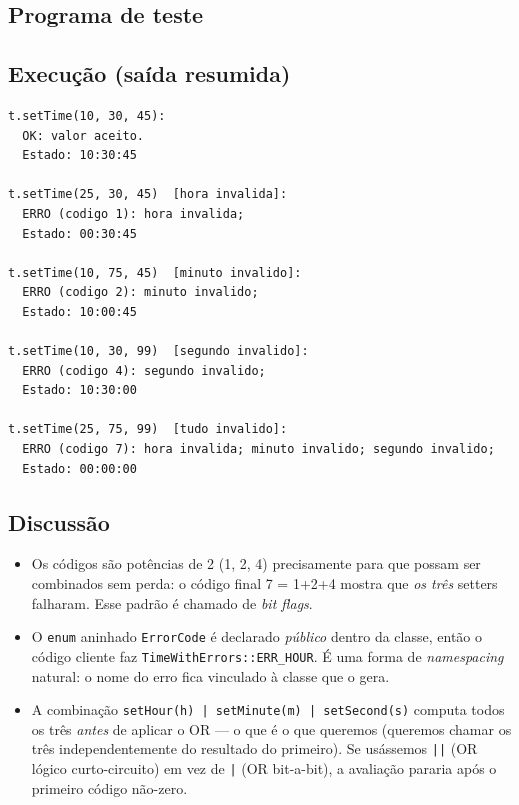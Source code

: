 \documentclass[11pt,a4paper]{article}
\begin{document}
\subsection*{Programa de teste}



\subsection*{Execu\c{c}\~ao (sa\'ida resumida)}

\begin{saidabox}
\begin{lstlisting}[style=terminal]
t.setTime(10, 30, 45):
  OK: valor aceito.
  Estado: 10:30:45

t.setTime(25, 30, 45)  [hora invalida]:
  ERRO (codigo 1): hora invalida;
  Estado: 00:30:45

t.setTime(10, 75, 45)  [minuto invalido]:
  ERRO (codigo 2): minuto invalido;
  Estado: 10:00:45

t.setTime(10, 30, 99)  [segundo invalido]:
  ERRO (codigo 4): segundo invalido;
  Estado: 10:30:00

t.setTime(25, 75, 99)  [tudo invalido]:
  ERRO (codigo 7): hora invalida; minuto invalido; segundo invalido;
  Estado: 00:00:00
\end{lstlisting}
\end{saidabox}

\subsection*{Discuss\~ao}

\begin{itemize}[leftmargin=*]
  \item Os c\'odigos s\~ao pot\^encias de 2 (1, 2, 4) precisamente para que possam ser combinados sem perda: o c\'odigo final 7 = 1+2+4 mostra que \emph{os tr\^es} setters falharam. Esse padr\~ao \'e chamado de \emph{bit flags}.
  \item O \texttt{enum} aninhado \texttt{ErrorCode} \'e declarado \emph{p\'ublico} dentro da classe, ent\~ao o c\'odigo cliente faz \texttt{TimeWithErrors::ERR\_HOUR}. \'E uma forma de \emph{namespacing} natural: o nome do erro fica vinculado \`a classe que o gera.
  \item A combina\c{c}\~ao \texttt{setHour(h) | setMinute(m) | setSecond(s)} computa todos os tr\^es \emph{antes} de aplicar o OR --- o que \'e o que queremos (queremos chamar os tr\^es independentemente do resultado do primeiro). Se us\'assemos \texttt{||} (OR l\'ogico curto-circuito) em vez de \texttt{|} (OR bit-a-bit), a avalia\c{c}\~ao pararia ap\'os o primeiro c\'odigo n\~ao-zero.
\end{itemize}
\end{document}
